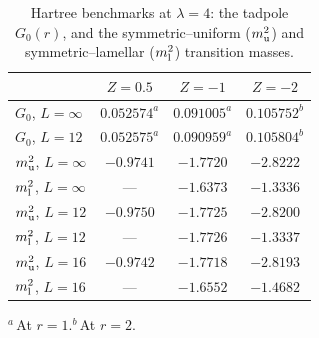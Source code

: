 \documentclass[aps,prd,twocolumn,superscriptaddress,nofootinbib,10pt]{revtex4-2}
\begin{document}
\begin{table}[b]
\caption{Hartree benchmarks at $\lambda=4$: the tadpole $G_0(r)$, and the
symmetric--uniform ($m^2_{\rm u}$) and symmetric--lamellar ($m^2_{\rm l}$)
transition masses.}
\label{tab:hartree-bench}
\begin{ruledtabular}
\begin{tabular}{lccc}
 & $Z=0.5$ & \multicolumn{1}{c}{$Z=-1$} & \multicolumn{1}{c}{$Z=-2$}\\
\hline
$G_0$, $L=\infty$ & $0.052574^{a}$ & $0.091005^{a}$ & $0.105752^{b}$\\
$G_0$, $L=12$     & $0.052575^{a}$ & $0.090959^{a}$ & $0.105804^{b}$\\
$m^2_{\rm u}$, $L=\infty$ & $-0.9741$ & $-1.7720$ & $-2.8222$\\
$m^2_{\rm l}$, $L=\infty$ & \multicolumn{1}{c}{---} & $-1.6373$ & $-1.3336$\\
$m^2_{\rm u}$, $L=12$ & $-0.9750$ & $-1.7725$ & $-2.8200$\\
$m^2_{\rm l}$, $L=12$ & \multicolumn{1}{c}{---} & $-1.7726$ & $-1.3337$\\
$m^2_{\rm u}$, $L=16$ & $-0.9742$ & $-1.7718$ & $-2.8193$\\
$m^2_{\rm l}$, $L=16$ & \multicolumn{1}{c}{---} & $-1.6552$ & $-1.4682$\\
\end{tabular}
\end{ruledtabular}
\begin{flushleft}\footnotesize
$^a$\,At $r=1$.\quad $^b$\,At $r=2$.
\end{flushleft}
\end{table}


\end{document}
